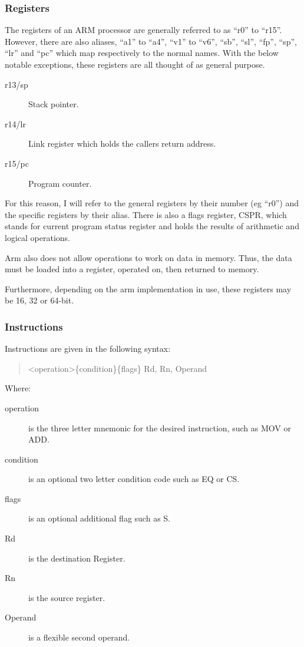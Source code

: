 			\subsubsection{Registers}
				The registers of an ARM processor are generally referred to as ``r0'' to ``r15''. 
				However, there are also aliases, ``a1'' to ``a4'', ``v1'' to ``v6'', ``sb'', ``sl'', ``fp'', ``sp'', ``lr'' and ``pc'' which map respectively to the normal names. 
				With the below notable exceptions, these registers are all thought of as general purpose. 
				\begin{description}
					\item[r13/sp] Stack pointer.
					\item[r14/lr] Link register which holds the callers return address. 
					\item[r15/pc] Program counter. 
				\end{description}
				For this reason, I will refer to the general registers by their number (eg ``r0'') and the specific registers by their alias. 
				There is also a flags register, CSPR, which stands for current program status register and holds the results of arithmetic and logical operations. 
				
				Arm also does not allow operations to work on data in memory. 
				Thus, the data must be loaded into a register, operated on, then returned to memory. 

				Furthermore, depending on the arm implementation in use, these registers may be 16, 32 or 64-bit. 
				
			\subsubsection{Instructions}
				Instructions are given in the following syntax:
				\begin{quote}
					<operation>\{condition\}\{flags\} Rd, Rn, Operand
				\end{quote}
				Where:
				\begin{description}
					\item[operation] is the three letter mnemonic for the desired instruction, such as MOV or ADD. 
					\item[condition] is an optional two letter condition code such as EQ or CS. 
					\item[flags] is an optional additional flag such as S.
					\item[Rd] is the destination Register.
					\item[Rn] is the source register. 
					\item[Operand] is a flexible second operand.
				\end{description}

